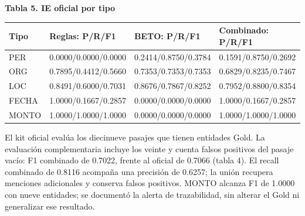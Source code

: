 \documentclass[11pt,a4paper]{article}
\begin{document}
\par\medskip\noindent\begin{minipage}{\linewidth}
\textbf{Tabla 5. IE oficial por tipo}\par\smallskip
\begin{tabularx}{\linewidth}{@{}lYYY@{}}\toprule
Tipo & Reglas: P/\allowbreak{}R/\allowbreak{}F1 & BETO: P/\allowbreak{}R/\allowbreak{}F1 & Combinado: P/\allowbreak{}R/\allowbreak{}F1 \\ \midrule
PER & 0.0000/\allowbreak{}0.0000/\allowbreak{}0.0000 & 0.2414/\allowbreak{}0.8750/\allowbreak{}0.3784 & 0.1591/\allowbreak{}0.8750/\allowbreak{}0.2692 \\
ORG & 0.7895/\allowbreak{}0.4412/\allowbreak{}0.5660 & 0.7353/\allowbreak{}0.7353/\allowbreak{}0.7353 & 0.6829/\allowbreak{}0.8235/\allowbreak{}0.7467 \\
LOC & 0.8491/\allowbreak{}0.6000/\allowbreak{}0.7031 & 0.8676/\allowbreak{}0.7867/\allowbreak{}0.8252 & 0.7952/\allowbreak{}0.8800/\allowbreak{}0.8354 \\
FECHA & 1.0000/\allowbreak{}0.1667/\allowbreak{}0.2857 & 0.0000/\allowbreak{}0.0000/\allowbreak{}0.0000 & 1.0000/\allowbreak{}0.1667/\allowbreak{}0.2857 \\
MONTO & 1.0000/\allowbreak{}1.0000/\allowbreak{}1.0000 & 0.0000/\allowbreak{}0.0000/\allowbreak{}0.0000 & 1.0000/\allowbreak{}1.0000/\allowbreak{}1.0000 \\
\bottomrule\end{tabularx}\end{minipage}\par\medskip
\par
El kit oficial evalúa los diecinueve pasajes que tienen entidades Gold. La evaluación complementaria incluye los veinte y cuenta falsos positivos del pasaje vacío: F1 combinado de 0.7022, frente al oficial de 0.7066 (tabla 4). El recall combinado de 0.8116 acompaña una precisión de 0.6257; la unión recupera menciones adicionales y conserva falsos positivos. MONTO alcanza F1 de 1.0000 con nueve entidades; se documentó la alerta de trazabilidad, sin alterar el Gold ni generalizar ese resultado.
\par
\newpage
\par
\end{document}
